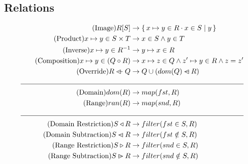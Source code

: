 \documentclass{article}
\newcommand{\bSet}[3]{%
  \{\, #1 \cdot #2 \mid #3 \, \}%
}
\begin{document}
\subsection{Relations}
  \begin{align}
  \tag{Image}
  R[S] &\rightarrow \bSet{x \mapsto y \in R}{x \in S}{y}
  \\
  \tag{Product}
  x \mapsto y \in S \times T &\rightarrow x \in S \land y \in T
  \\
  \tag{Inverse}
  x \mapsto y \in R^{-1} &\rightarrow y \mapsto x \in R
  \\
  \tag{Composition}
  x \mapsto y \in (Q \circ R) &\rightarrow x \mapsto z \in Q \land z' \mapsto y \in R \land z=z'
  \\
  \tag{Override}
  R \ovl Q &\rightarrow Q \cup (dom(Q) \domsub R)
  \\
  \cline{1-2}
  \tag{Domain}
  dom(R) &\rightarrow map(fst, R)
  \\
  \tag{Range}
  ran(R) &\rightarrow map(snd, R)
  \\
  \cline{1-2}
  \tag{Domain Restriction}
  S \triangleleft R &\rightarrow filter(fst \in S, R)
  \\
  \tag{Domain Subtraction}
  S \domsub R &\rightarrow filter(fst \notin S, R)
  \\
  \tag{Range Restriction}
  S \triangleright R &\rightarrow filter(snd \in S, R)
  \\
  \tag{Range Subtraction}
  S \ransub R &\rightarrow filter(snd \notin S, R)
\end{align}

\end{document}
